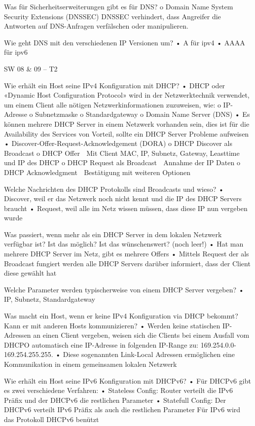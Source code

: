 \begin{itemize}
Was für Sicherheitserweiterungen gibt es für DNS?
o	Domain Name System Security Extensions (DNSSEC) DNSSEC verhindert, dass Angreifer die Antworten auf DNS-Anfragen verfälschen oder manipulieren. 


Wie geht DNS mit den verschiedenen IP Versionen um?
•	A für ipv4
•	AAAA für ipv6

SW 08 & 09 – T2

Wie erhält ein Host seine IPv4 Konfiguration mit DHCP?
•	DHCP oder «Dynamic Host Configuration Protocol» wird in der Netzwerktechnik verwendet, um einem Client alle nötigen Netzwerkinformationen zuzuweisen, wie: 
o	IP-Adresse 
o	Subnetzmaske 
o	Standardgateway 
o	Domain Name Server (DNS)
•	Es können mehrere DHCP Server in einem Netzwerk vorhanden sein, dies ist für die Availability des Services von Vorteil, sollte ein DHCP Server Probleme aufweisen
•	Discover-Offer-Request-Acknowledgement (DORA)
o	DHCP Discover als Broadcast
o	DHCP Offer
	Mit Client MAC, IP, Subnetz, Gateway, Leasttime und IP des DHCP
o	DHCP Request als Broadcast
	Annahme der IP Daten 
o	DHCP Acknowledgment
	Bestätigung mit weiteren Optionen


Welche Nachrichten des DHCP Protokolls sind Broadcasts und wieso?
•	Discover, weil er das Netzwerk noch nicht kennt und die IP des DHCP Servers braucht
•	Request, weil alle im Netz wissen müssen, dass diese IP nun vergeben wurde
 

Was passiert, wenn mehr als ein DHCP Server in dem lokalen Netzwerk verfügbar ist? Ist das möglich? Ist das wünschenswert? (noch leer!)
•	Hat man mehrere DHCP Server im Netz, gibt es mehrere Offers
•	Mittels Request der als Broadcast fungiert werden alle DHCP Servers darüber informiert, dass der Client diese gewählt hat

Welche Parameter werden typischerweise von einem DHCP Server vergeben?
•	IP, Subnetz, Standardgateway

Was macht ein Host, wenn er keine IPv4 Konfiguration via DHCP bekommt? Kann er mit anderen Hosts kommunizieren?
•	Werden keine statischen IP-Adressen an einen Client vergeben, weisen sich die Clients bei einem Ausfall vom DHCPO automatisch eine IP-Adresse in folgenden IP-Range zu: 169.254.0.0- 169.254.255.255. 
•	Diese sogenannten Link-Local Adressen ermöglichen eine Kommunikation in einem gemeinsamen lokalen Netzwerk

Wie erhält ein Host seine IPv6 Konfiguration mit DHCPv6?
•	 Für DHCPv6 gibt es zwei verschiedene Verfahren: 
•	Stateless Config: Router verteilt die IPv6 Präfix und der DHCPv6 die restlichen Parameter 
•	Statefull Config: Der DHCPv6 verteilt IPv6 Präfix als auch die restlichen Parameter Für IPv6 wird das Protokoll DHCPv6 benützt


\end{itemize}
